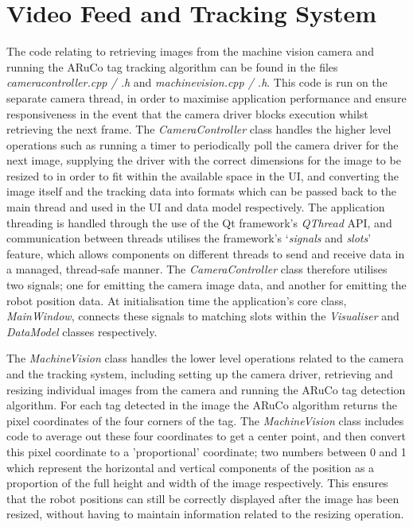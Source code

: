 \section{Video Feed and Tracking System} \label{VideoFeedAndTrackingSystem}
The code relating to retrieving images from the machine vision camera and running the ARuCo tag tracking algorithm can be found in the files \textit{cameracontroller.cpp / .h} and \textit{machinevision.cpp / .h}. This code is run on the separate camera thread, in order to maximise application performance and ensure responsiveness in the event that the camera driver blocks execution whilst retrieving the next frame. The \textit{CameraController} class handles the higher level operations such as running a timer to periodically poll the camera driver for the next image, supplying the driver with the correct dimensions for the image to be resized to in order to fit within the available space in the UI, and converting the image itself and the tracking data into formats which can be passed back to the main thread and used in the UI and data model respectively. The application threading is handled through the use of the Qt framework's \textit{QThread} API, and communication between threads utilises the framework's `\textit{signals} and \textit{slots}' feature, which allows components on different threads to send and receive data in a managed, thread-safe manner. The \textit{CameraController} class therefore utilises two signals; one for emitting the camera image data, and another for emitting the robot position data. At initialisation time the application's core class, \textit{MainWindow}, connects these signals to matching slots within the \textit{Visualiser} and \textit{DataModel} classes respectively.

The \textit{MachineVision} class handles the lower level operations related to the camera and the tracking system, including setting up the camera driver, retrieving and resizing individual images from the camera and running the ARuCo tag detection algorithm. For each tag detected in the image the ARuCo algorithm returns the pixel coordinates of the four corners of the tag. The \textit{MachineVision} class includes code to average out these four coordinates to get a center point, and then convert this pixel coordinate to a 'proportional' coordinate; two numbers between 0 and 1 which represent the horizontal and vertical components of the position as a proportion of the full height and width of the image respectively. This ensures that the robot positions can still be correctly displayed after the image has been resized, without having to maintain information related to the resizing operation.

